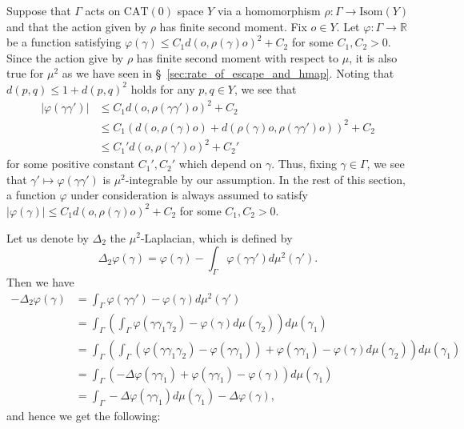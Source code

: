 \documentclass[12pt]{amsart}
\numberwithin{equation}{section}
\theoremstyle{plain}
\theoremstyle{definition}
\theoremstyle{remark}
\newcommand{\R}{{\mathbb R}}
\newcommand{\isom}[1]{\mathrm{Isom}({#1})}
\newcommand{\cat}[1]{\mathrm{CAT}(#1)}
\begin{document}
%
%
 Suppose that $\Gamma$ acts on $\cat{0}$ space $Y$ via a homomorphism
 $\rho\colon \Gamma \rightarrow \isom{Y}$ and that the action given by
 $\rho$ has finite second moment. 
 Fix $o \in Y$. 
 Let $\varphi\colon \Gamma \rightarrow \R$ be a function satisfying 
 $\varphi(\gamma) \leq C_1 d(o,\rho(\gamma)o)^2+C_2$ for some
 $C_1,C_2>0$. 
 Since the action give by $\rho$ has finite second moment with respect
 to $\mu$, it is also true for $\mu^2$ as we have seen
 in \S~\ref{sec:rate_of_escape_and_hmap}. 
 Noting that $d(p,q) \leq 1+d(p,q)^2$ holds for any $p,q \in Y$,  we see
 that
\begin{equation*}
\begin{split}
  |\varphi(\gamma \gamma')| &\leq C_1 d(o,\rho(\gamma \gamma')o)^2 + C_2 \\
  & \leq C_1
 \left(d(o,\rho(\gamma)o)+d(\rho(\gamma)o,\rho(\gamma\gamma')o)\right)^2
 + C_2 \\
  & \leq C_1'd(o,\rho(\gamma')o)^2 + C_2'
\end{split}
\end{equation*}
 for some positive constant $C_1', C_2'$ which depend on $\gamma$. 
 Thus, fixing $\gamma \in \Gamma$, 
 we see that $\gamma' \mapsto \varphi(\gamma \gamma')$ is
 $\mu^2$-integrable by our assumption. 
 In the rest of this section, a function $\varphi$ under consideration
 is always assumed to satisfy
 $|\varphi(\gamma)| \leq C_1 d(o,\rho(\gamma)o)^2 + C_2$ for some
 $C_1,C_2>0$.

%
%
 Let us denote by $\Delta_2$ the $\mu^2$-Laplacian, which is defined by 
\begin{equation*}
 \Delta_2 \varphi (\gamma) = 
 \varphi(\gamma)- \int_{\Gamma} \varphi(\gamma\gamma') d\mu^2(\gamma'). 
\end{equation*}
 Then we have
\begin{equation*}
   \begin{split}
    -\Delta_2 \varphi(\gamma) & = 
    \int_{\Gamma} \varphi(\gamma \gamma') - \varphi(\gamma) d\mu^2(\gamma') \\
    & = \int_{\Gamma} \left(\int_{\Gamma} 
      \varphi(\gamma \gamma_1 \gamma_2) - \varphi(\gamma) d\mu(\gamma_2)\right)
      d\mu(\gamma_1) \\
    & = \int_{\Gamma} \left(\int_{\Gamma} 
      \left(\varphi(\gamma \gamma_1 \gamma_2) - \varphi(\gamma \gamma_1)\right)
      + \varphi(\gamma \gamma_1) - \varphi(\gamma)
      d\mu(\gamma_2)\right) d\mu(\gamma_1) \\
    & = \int_{\Gamma}
       \left(
     -\Delta \varphi(\gamma \gamma_1) + \varphi(\gamma \gamma_1) -
      \varphi(\gamma)\right)
      d\mu(\gamma_1) \\
    & =\int_{\Gamma}-\Delta \varphi(\gamma\gamma_1) d\mu(\gamma_1)
      -\Delta \varphi(\gamma), 
  \end{split}
 \end{equation*}
and hence we get the following: 
\end{document}
